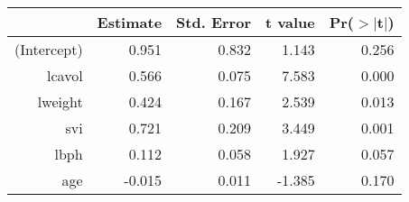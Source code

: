 \begin{table}[ht]
\centering
\begin{tabular}{rrrrr}
  \hline
 & Estimate & Std. Error & t value & Pr($>$$|$t$|$) \\ 
  \hline
(Intercept) & 0.951 & 0.832 & 1.143 & 0.256 \\ 
  lcavol & 0.566 & 0.075 & 7.583 & 0.000 \\ 
  lweight & 0.424 & 0.167 & 2.539 & 0.013 \\ 
  svi & 0.721 & 0.209 & 3.449 & 0.001 \\ 
  lbph & 0.112 & 0.058 & 1.927 & 0.057 \\ 
  age & -0.015 & 0.011 & -1.385 & 0.170 \\ 
   \hline
\end{tabular}
\end{table}
